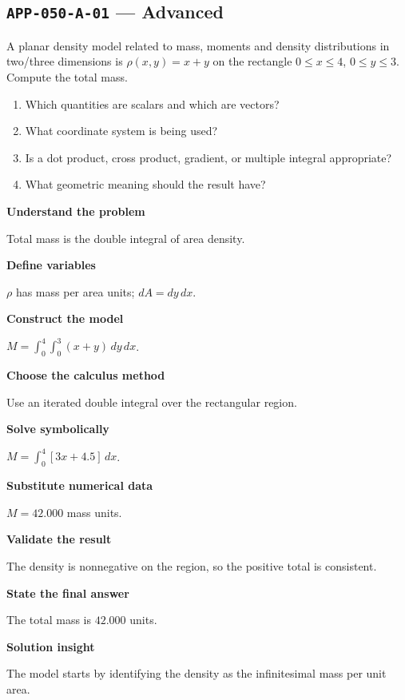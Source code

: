 \documentclass[11pt]{book}
\newcommand{\pid}[1]{\texttt{#1}}
\begin{document}
\subsection*{\pid{APP-050-A-01} — Advanced}
\begin{problembox}
A planar density model related to mass, moments and density distributions in two/three dimensions is $\rho(x,y)=x+y$ on the rectangle $0\le x\le 4$, $0\le y\le 3$. Compute the total mass.
\end{problembox}
\begin{promptbox}\begin{enumerate}
\item Which quantities are scalars and which are vectors?
\item What coordinate system is being used?
\item Is a dot product, cross product, gradient, or multiple integral appropriate?
\item What geometric meaning should the result have?
\end{enumerate}\end{promptbox}
\begin{solutionbox}
\textbf{Understand the problem}\par Total mass is the double integral of area density.\par\medskip
\textbf{Define variables}\par $\rho$ has mass per area units; $dA=dy\,dx$.\par\medskip
\textbf{Construct the model}\par $M=\int_0^{4}\int_0^{3}(x+y)\,dy\,dx$.\par\medskip
\textbf{Choose the calculus method}\par Use an iterated double integral over the rectangular region.\par\medskip
\textbf{Solve symbolically}\par $M=\int_0^{4}[3x+4.5]\,dx$.\par\medskip
\textbf{Substitute numerical data}\par $M=42.000$ mass units.\par\medskip
\textbf{Validate the result}\par The density is nonnegative on the region, so the positive total is consistent.\par\medskip
\textbf{State the final answer}\par The total mass is $42.000$ units.\par\medskip
\textbf{Solution insight}\par The model starts by identifying the density as the infinitesimal mass per unit area.\par\medskip
\end{solutionbox}
\end{document}

